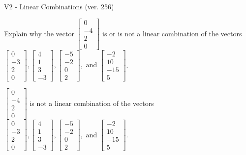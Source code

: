 \begin{exercise}
  \begin{exerciseTitle}V2 - Linear Combinations (ver. 256)\end{exerciseTitle}
  \begin{exerciseStatement}
    Explain why the vector \(\left[\begin{array}{c}
0 \\
-4 \\
2 \\
0
\end{array}\right]\)  is or is not a linear 
	combination of the vectors \(\left[\begin{array}{c}
0 \\
-3 \\
2 \\
0
\end{array}\right] , \left[\begin{array}{c}
4 \\
1 \\
3 \\
-3
\end{array}\right] , \left[\begin{array}{c}
-5 \\
-2 \\
0 \\
2
\end{array}\right] , \text{ and } \left[\begin{array}{c}
-2 \\
10 \\
-15 \\
5
\end{array}\right]\).
	


  \end{exerciseStatement}
  \begin{exerciseAnswer}
   \(\left[\begin{array}{c}
0 \\
-4 \\
2 \\
0
\end{array}\right]\) 
  	 is not  
	a linear combination of the vectors \(\left[\begin{array}{c}
0 \\
-3 \\
2 \\
0
\end{array}\right] , \left[\begin{array}{c}
4 \\
1 \\
3 \\
-3
\end{array}\right] , \left[\begin{array}{c}
-5 \\
-2 \\
0 \\
2
\end{array}\right] , \text{ and } \left[\begin{array}{c}
-2 \\
10 \\
-15 \\
5
\end{array}\right]\).


\end{exerciseAnswer}
\end{exercise}
